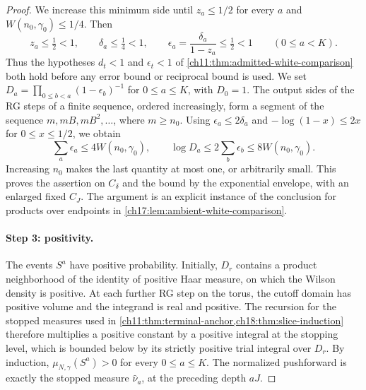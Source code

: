 \begin{proof}
We increase this minimum side until $z_a\le1/2$ for every $a$ and $W(n_0,\gamma_0)\le1/4$. Then
\begin{equation}\label{ch19:eq:prefix-positivity-gates}
 z_a\le\tfrac12<1,\qquad\delta_a\le\tfrac14<1,\qquad\epsilon_a=\frac{\delta_a}{1-z_a}\le\tfrac12<1\qquad(0\le a<K).
\end{equation}
Thus the hypotheses $d_t<1$ and $\epsilon_t<1$ of \cref{ch11:thm:admitted-white-comparison} both hold before any error bound or reciprocal bound is used. We set $D_a=\prod_{0\le b<a}(1-\epsilon_b)^{-1}$ for $0\le a\le K$, with $D_0=1$. The output sides of the RG steps of a finite sequence, ordered increasingly, form a segment of the sequence $m,mB,mB^2,\dots$, where $m\ge n_0$. Using $\epsilon_a\le2\delta_a$ and $-\log(1-x)\le2x$ for $0\le x\le1/2$, we obtain
\[
 \sum_a\epsilon_a\le4W(n_0,\gamma_0),\qquad
 \log D_a\le2\sum_b\epsilon_b\le8W(n_0,\gamma_0).
\]
Increasing $n_0$ makes the last quantity at most one, or arbitrarily small. This proves the assertion on $C_\delta$ and the bound by the exponential envelope, with an enlarged fixed $C_J$. The argument is an explicit instance of the conclusion for products over endpoints in \cref{ch17:lem:ambient-white-comparison}.

\paragraph{Step 3: positivity.}
The events $S^a$ have positive probability. Initially, $D_r$ contains a product neighborhood of the identity of positive Haar measure, on which the Wilson density is positive. At each further RG step on the torus, the cutoff domain has positive volume and the integrand is real and positive. The recursion for the stopped measures used in \cref{ch11:thm:terminal-anchor,ch18:thm:slice-induction} therefore multiplies a positive constant by a positive integral at the stopping level, which is bounded below by its strictly positive trial integral over $D_r$. By induction, $\mu_{N,\gamma}(S^a)>0$ for every $0\le a\le K$. The normalized pushforward is exactly the stopped measure $\widehat\nu_a$, at the preceding depth $aJ$.


\end{proof}
